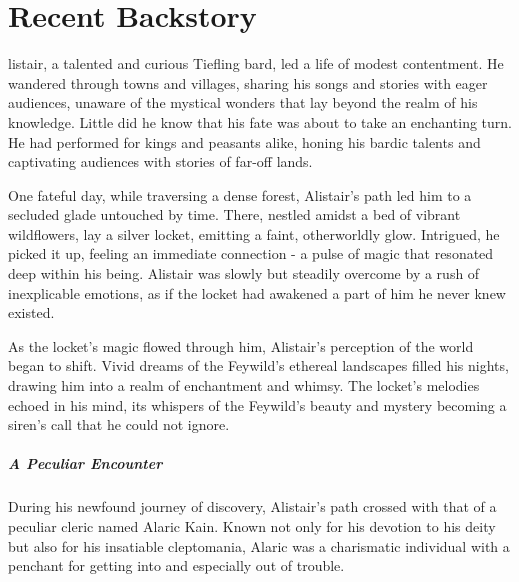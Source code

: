 \documentclass[letterpaper,openany,oneside,twocolumn]{book}
\begin{document}
\onecolumn


\rendercharactersheet

\renderbackgroundsheet

\renderspellsheet


\restoregeometry
\twocolumn

\chapter*{Recent Backstory}

{\noindent \entryfont {}listair, a talented and curious Tiefling bard, led a life of modest contentment. He wandered through towns and villages, sharing his songs and stories with eager audiences, unaware of the mystical wonders that lay beyond the realm of his knowledge. Little did he know that his fate was about to take an enchanting turn. He had performed for kings and peasants alike, honing his bardic talents and captivating audiences with stories of far-off lands.

One fateful day, while traversing a dense forest, Alistair's path led him to a secluded glade untouched by time. There, nestled amidst a bed of vibrant wildflowers, lay a silver locket, emitting a faint, otherworldly glow. Intrigued, he picked it up, feeling an immediate connection - a pulse of magic that resonated deep within his being. Alistair was slowly but steadily overcome by a rush of inexplicable emotions, as if the locket had awakened a part of him he never knew existed.

As the locket's magic flowed through him, Alistair's perception of the world began to shift. Vivid dreams of the Feywild's ethereal landscapes filled his nights, drawing him into a realm of enchantment and whimsy. The locket's melodies echoed in his mind, its whispers of the Feywild's beauty and mystery becoming a siren's call that he could not ignore.\\

\paragraph*{A Peculiar Encounter} During his newfound journey of discovery, Alistair's path crossed with that of a peculiar cleric named Alaric Kain. Known not only for his devotion to his deity but also for his insatiable cleptomania, Alaric was a charismatic individual with a penchant for getting into and especially out of trouble.

}
\end{document}
